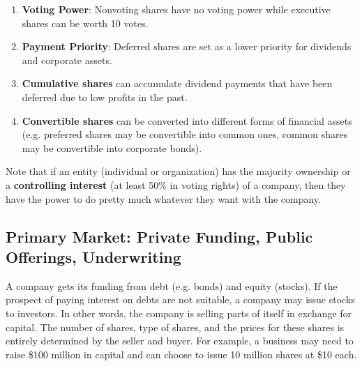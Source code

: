 \documentclass{article}
\begin{document}
\begin{enumerate}
    \item \textbf{Voting Power}: Nonvoting shares have no voting power while executive shares can be worth 10 votes. 
    \item \textbf{Payment Priority}: Deferred shares are set as a lower priority for dividends and corporate assets. 
    \item \textbf{Cumulative shares} can accumulate dividend payments that have been deferred due to low profits in the past. 
    \item \textbf{Convertible shares} can be converted into different forms of financial assets (e.g. preferred shares may be convertible into common ones, common shares may be convertible into corporate bonds).
\end{enumerate}
Note that if an entity (individual or organization) has the majority ownership or a \textbf{controlling interest} (at least 50\% in voting rights) of a company, then they have the power to do pretty much whatever they want with the company. 

\subsection{Primary Market: Private Funding, Public Offerings, Underwriting}

A company gets its funding from debt (e.g. bonds) and equity (stocks). If the prospect of paying interest on debts are not suitable, a company may issue stocks to investors. In other words, the company is selling parts of itself in exchange for capital. The number of shares, type of shares, and the prices for these shares is entirely determined by the seller and buyer. For example, a business may need to raise \$100 million in capital and can choose to issue 10 million shares at \$10 each.
\end{document}
